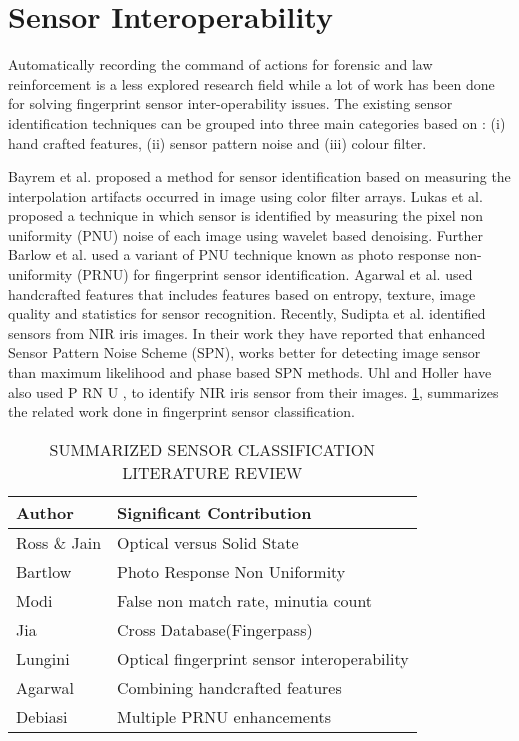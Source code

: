 \section{Sensor Interoperability}
Automatically recording the command of actions for forensic and law reinforcement is a less explored research field while a lot of work has been done for solving fingerprint sensor inter-operability issues. The existing sensor identification techniques can be grouped into three main categories based on : (i) hand crafted features, (ii) sensor pattern noise and (iii) colour filter.

Bayrem et al. \cite{Bayram2005SourceCI} proposed a method for sensor identification based on measuring the interpolation artifacts occurred in image using color filter arrays. Lukas et al. \cite{Luks2006DigitalCI} proposed a technique in which sensor is identified by measuring the pixel non uniformity (PNU) noise of each image using wavelet based denoising. Further Barlow et al. \cite{Bartlow2009IdentifyingSF} used a variant of PNU technique known as photo response non-uniformity (PRNU) for fingerprint sensor identification. Agarwal et al. \cite{Agarwal2016FingerprintSC} used handcrafted features that includes features based on entropy, texture, image quality and statistics for sensor recognition. Recently, Sudipta et al. \cite{0e38c254baeb449390a4a998005596f7} identified sensors from NIR iris images. In their work they have reported that enhanced Sensor Pattern Noise Scheme (SPN), works better for detecting image sensor than maximum likelihood and phase based SPN methods. Uhl and Holler \cite{Uhl2012IrissensorAU} have also used P RN U , to identify NIR iris sensor from their images. \ref{table1}, summarizes the related work done in fingerprint sensor classification.


\begin{table}[th]
\caption{SUMMARIZED SENSOR CLASSIFICATION LITERATURE REVIEW}
\vspace{2mm}
\centering
\begin{tabular}{|l|l|}
\hline
Author                & Significant Contribution                    \\ \hline
Ross \& Jain \cite{Ross2004BiometricSI}  & Optical versus Solid State                  \\ \hline
Bartlow \cite{Bartlow2009IdentifyingSF}      & Photo Response Non Uniformity               \\ \hline
Modi \cite{modi2009statistical}         & False non match rate, minutia count         \\ \hline
Jia \cite{Jia2012ACM}          & Cross Database(Fingerpass)                  \\ \hline
Lungini \cite{Lugini2013InteroperabilityIF}      & Optical fingerprint sensor interoperability \\ \hline
Agarwal \cite{Agarwal2016FingerprintSC}       & Combining handcrafted features              \\ \hline
Debiasi \cite{Debiasi2015BlindBS}      & Multiple PRNU enhancements                  \\ \hline
\end{tabular}
\label{table1}
\end{table}